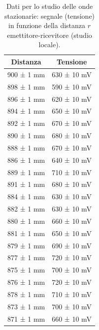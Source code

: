 \documentclass[a4paper]{article}
\begin{document}
\begin{table}[htbp]
\centering
\begin{tabular}{|c|c|}
\hline
Distanza & Tensione \\\hline\hline
900 ± 1 mm & 630 ± 10 mV \\
898 ± 1 mm & 590 ± 10 mV \\
896 ± 1 mm & 620 ± 10 mV \\
894 ± 1 mm & 650 ± 10 mV \\
892 ± 1 mm & 670 ± 10 mV \\
890 ± 1 mm & 680 ± 10 mV \\
888 ± 1 mm & 670 ± 10 mV \\
886 ± 1 mm & 640 ± 10 mV \\
889 ± 1 mm & 710 ± 10 mV \\
891 ± 1 mm & 680 ± 10 mV \\
884 ± 1 mm & 630 ± 10 mV \\
882 ± 1 mm & 630 ± 10 mV \\
880 ± 1 mm & 660 ± 10 mV \\
881 ± 1 mm & 650 ± 10 mV \\
879 ± 1 mm & 690 ± 10 mV \\
877 ± 1 mm & 720 ± 10 mV \\
875 ± 1 mm & 700 ± 10 mV \\
876 ± 1 mm & 720 ± 10 mV \\
878 ± 1 mm & 710 ± 10 mV \\
873 ± 1 mm & 700 ± 10 mV \\
871 ± 1 mm & 660 ± 10 mV \\
\hline
\end{tabular}
\caption{Dati per lo studio delle onde stazionarie: segnale (tensione) in funzione della distanza $r$ emettitore-ricevitore (studio locale).}
\label{tab:dati_ampgeom_ondestazionarie}
\end{table}
\end{document}
